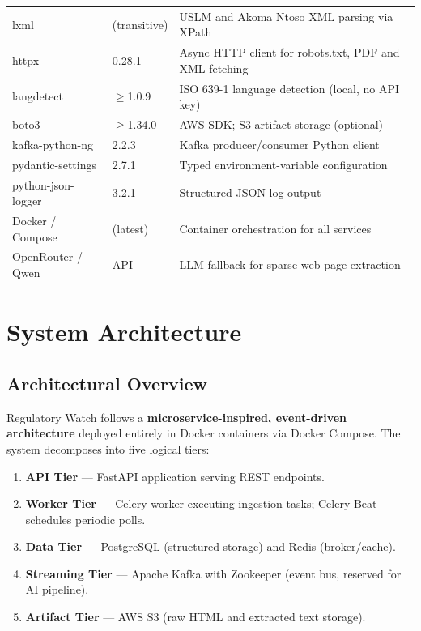 \documentclass[12pt,a4paper]{article}
\begin{document}
\begin{longtable}{@{}p{4cm} p{3cm} p{7.5cm}@{}}
lxml                  & (transitive)     & USLM and Akoma Ntoso XML parsing via XPath \\
httpx                 & 0.28.1           & Async HTTP client for robots.txt, PDF and XML fetching \\
langdetect            & $\geq$1.0.9     & ISO 639-1 language detection (local, no API key) \\
boto3                 & $\geq$1.34.0    & AWS SDK; S3 artifact storage (optional) \\
kafka-python-ng       & 2.2.3            & Kafka producer/consumer Python client \\
pydantic-settings     & 2.7.1            & Typed environment-variable configuration \\
python-json-logger    & 3.2.1            & Structured JSON log output \\
Docker / Compose      & (latest)         & Container orchestration for all services \\
OpenRouter / Qwen     & API              & LLM fallback for sparse web page extraction \\
\end{longtable}

\section{System Architecture}

\subsection{Architectural Overview}

Regulatory Watch follows a \textbf{microservice-inspired, event-driven architecture} deployed entirely in Docker containers via Docker Compose. The system decomposes into five logical tiers:

\begin{enumerate}[noitemsep]
  \item \textbf{API Tier} — FastAPI application serving REST endpoints.
  \item \textbf{Worker Tier} — Celery worker executing ingestion tasks; Celery Beat schedules periodic polls.
  \item \textbf{Data Tier} — PostgreSQL (structured storage) and Redis (broker/cache).
  \item \textbf{Streaming Tier} — Apache Kafka with Zookeeper (event bus, reserved for AI pipeline).
  \item \textbf{Artifact Tier} — AWS S3 (raw HTML and extracted text storage).
\end{enumerate}
\end{document}
